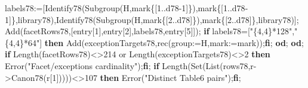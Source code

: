 \documentclass[
  10pt,
  letterpaper,
]{article}
\newenvironment{Shaded}{}{}
\newcommand{\BuiltInTok}[1]{\textcolor[rgb]{0.00,0.50,0.00}{#1}}
\newcommand{\ConstantTok}[1]{\textcolor[rgb]{0.53,0.00,0.00}{#1}}
\newcommand{\ControlFlowTok}[1]{\textcolor[rgb]{0.00,0.44,0.13}{\textbf{#1}}}
\newcommand{\ExtensionTok}[1]{#1}
\newcommand{\FloatTok}[1]{\textcolor[rgb]{0.25,0.63,0.44}{#1}}
\newcommand{\NormalTok}[1]{#1}
\newcommand{\OperatorTok}[1]{\textcolor[rgb]{0.40,0.40,0.40}{#1}}
\newcommand{\StringTok}[1]{\textcolor[rgb]{0.25,0.44,0.63}{#1}}
\newcommand{\VariableTok}[1]{\textcolor[rgb]{0.10,0.09,0.49}{#1}}
\begin{document}
\begin{Shaded}
\begin{Highlighting}[]
  \VariableTok{labels78}\OperatorTok{:=}\NormalTok{[}\VariableTok{Identify78}\NormalTok{(}\BuiltInTok{Subgroup}\NormalTok{(}\VariableTok{H}\OperatorTok{,}\VariableTok{mark}\NormalTok{\{[}\FloatTok{1}\OperatorTok{..}\VariableTok{d78}\OperatorTok{{-}}\FloatTok{1}\NormalTok{]\})}\OperatorTok{,}\VariableTok{mark}\NormalTok{\{[}\FloatTok{1}\OperatorTok{..}\VariableTok{d78}\OperatorTok{{-}}\FloatTok{1}\NormalTok{]\}}\OperatorTok{,}\VariableTok{library78}\NormalTok{)}\OperatorTok{,}\VariableTok{Identify78}\NormalTok{(}\BuiltInTok{Subgroup}\NormalTok{(}\VariableTok{H}\OperatorTok{,}\VariableTok{mark}\NormalTok{\{[}\FloatTok{2}\OperatorTok{..}\VariableTok{d78}\NormalTok{]\})}\OperatorTok{,}\VariableTok{mark}\NormalTok{\{[}\FloatTok{2}\OperatorTok{..}\VariableTok{d78}\NormalTok{]\}}\OperatorTok{,}\VariableTok{library78}\NormalTok{)]}\OperatorTok{;}
  \BuiltInTok{Add}\NormalTok{(}\VariableTok{facetRows78}\OperatorTok{,}\NormalTok{[}\VariableTok{entry}\NormalTok{[}\FloatTok{1}\NormalTok{]}\OperatorTok{,}\VariableTok{entry}\NormalTok{[}\FloatTok{2}\NormalTok{]}\OperatorTok{,}\VariableTok{labels78}\OperatorTok{,}\VariableTok{entry}\NormalTok{[}\FloatTok{5}\NormalTok{]])}\OperatorTok{;}
  \ControlFlowTok{if} \VariableTok{labels78}\OperatorTok{=}\NormalTok{[}\StringTok{"\{4,4\}*128"}\OperatorTok{,}\StringTok{"\{4,4\}*64"}\NormalTok{] }\ControlFlowTok{then} \BuiltInTok{Add}\NormalTok{(}\VariableTok{exceptionTargets78}\OperatorTok{,}\ExtensionTok{rec}\NormalTok{(}\VariableTok{group}\OperatorTok{:=}\VariableTok{H}\OperatorTok{,}\VariableTok{mark}\OperatorTok{:=}\VariableTok{mark}\NormalTok{))}\OperatorTok{;}\ControlFlowTok{fi}\OperatorTok{;}
 \ControlFlowTok{od}\OperatorTok{;}
\ControlFlowTok{od}\OperatorTok{;}
\ControlFlowTok{if} \BuiltInTok{Length}\NormalTok{(}\VariableTok{facetRows78}\NormalTok{)}\OperatorTok{\textless{}\textgreater{}}\FloatTok{214} \ConstantTok{or} \BuiltInTok{Length}\NormalTok{(}\VariableTok{exceptionTargets78}\NormalTok{)}\OperatorTok{\textless{}\textgreater{}}\FloatTok{2} \ControlFlowTok{then} \BuiltInTok{Error}\NormalTok{(}\StringTok{"Facet/exceptions cardinality"}\NormalTok{)}\OperatorTok{;}\ControlFlowTok{fi}\OperatorTok{;}
\ControlFlowTok{if} \BuiltInTok{Length}\NormalTok{(}\BuiltInTok{Set}\NormalTok{(}\BuiltInTok{List}\NormalTok{(}\VariableTok{rows78}\OperatorTok{,}\VariableTok{r}\OperatorTok{{-}\textgreater{}}\VariableTok{Canon78}\NormalTok{(}\VariableTok{r}\NormalTok{[}\FloatTok{1}\NormalTok{]))))}\OperatorTok{\textless{}\textgreater{}}\FloatTok{107} \ControlFlowTok{then} \BuiltInTok{Error}\NormalTok{(}\StringTok{"Distinct Table6 pairs"}\NormalTok{)}\OperatorTok{;}\ControlFlowTok{fi}\OperatorTok{;}

\end{Highlighting}
\end{Shaded}
\end{document}
